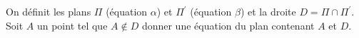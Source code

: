 On d\'efinit les plans $\Pi$ (\'equation $\alpha$) et $\Pi^\prime$ (\'equation $\beta$) et la droite $D=\Pi\cap \Pi^\prime$. Soit $A$ un point tel que $A\notin D$ donner une \'equation du plan contenant $A$ et $D$.
\medskip
